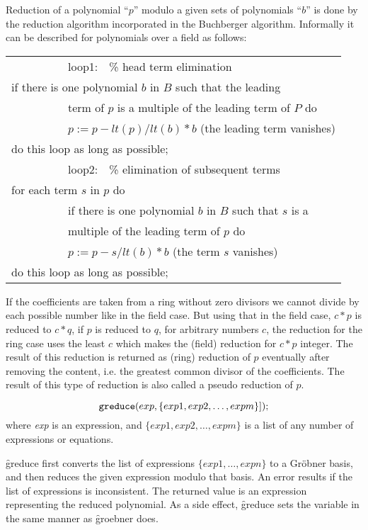  \label{groebner:background}
Reduction of a polynomial ``$p$'' modulo a given sets of polynomials
``$b$'' is done by the reduction algorithm incorporated in the
Buchberger algorithm. Informally it can be described for
polynomials over a field as follows:
\begin{center}
\begin{tabular}{l}
~~~~~~~~~~loop1:~~\% head term elimination \\
if there is one polynomial $b$ in $B$ such that the leading \\
~~~~~~~~~~term of $p$ is a multiple of the leading term of $P$ do \\
~~~~~~~~~~$p := p - lt(p)/lt(b) * b$  (the leading term vanishes) \\
do this loop as long as possible; \\
~~~~~~~~~~loop2:~~\% elimination of subsequent terms \\
for each term $s$ in $p$ do \\
~~~~~~~~~~if there is one polynomial $b$ in $B$ such that $s$ is a \\
~~~~~~~~~~multiple of the leading term of $p$ do \\
~~~~~~~~~~$p := p - s/lt(b) * b$ (the term $s$ vanishes) \\
do this loop as long as possible;
\end{tabular}
\end{center}

If the coefficients are taken from a ring without zero divisors we
cannot divide by each possible number like in the field case. But
using that in the field case,  $c*p $ is reduced to  $c*q $, if $ p $
is reduced to $ q $, for arbitrary numbers $ c $,  the reduction for
the ring case uses the least $ c $ which makes the (field) reduction
for $ c*p $ integer. The result of this reduction is returned as
(ring) reduction of $ p $ eventually after removing the content, i.e.
the greatest common divisor of the coefficients. The result of this
type of reduction is also called a pseudo reduction of $ p $.

\hypertarget{operator:GREDUCE}{}
\[
\texttt{greduce}(exp, \{exp1, exp2, \ldots , expm\}]);
\]
where \textit{exp} is an expression, and $\{exp1, exp2,\ldots , expm\}$ is
a list of any number of expressions or equations.

\f{greduce} first converts the list of expressions $\{exp1, \ldots ,
expn\}$ to a Gr\"obner basis, and then reduces the given expression
modulo that basis.  An error results if the list of expressions is
inconsistent. The returned value is an expression representing the
reduced polynomial. As a side effect, \f{greduce} sets the variable
 in the same manner as \f{groebner} does.

